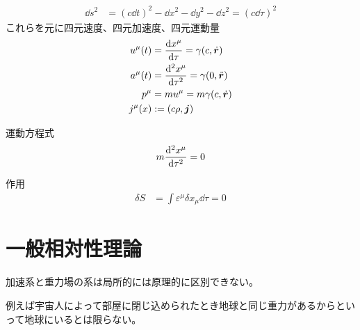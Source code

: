 \documentclass[uplatex,dvipdfmx,a4paper,11pt]{jlreq}
\newcommand{\rr}{\bm{r}}
\theoremstyle{definition}
\begin{document}
\begin{definition}[世界間隔]
  \begin{align}
    \dd{s}^2 & = (c\dd{t})^2 - \dd{x}^2 - \dd{y}^2 - \dd{z}^2 = (c\dd{\tau})^2
  \end{align}
  これらを元に四元速度、四元加速度、四元運動量
  \begin{align}
    u^\mu(t) & = \dv{x^\mu}{\tau} = \gamma(c, \dot{\rr})     \\
    a^\mu(t) & = \dv[2]{x^\mu}{\tau} = \gamma(0, \ddot{\rr}) \\
    p^\mu    & = mu^\mu = m\gamma(c, \dot{\rr})              \\
    j^\mu(x) & := (c\rho, \bm{j})                            \\
  \end{align}
\end{definition}

運動方程式
\begin{align}
  m\dv[2]{x^\mu}{\tau} = 0
\end{align}

作用
\begin{align}
  \delta S & = \int \varepsilon^\mu\delta x_\mu\dd{\tau} = 0
\end{align}

\section{一般相対性理論}
\begin{axiom}[アインシュタインの等価原理]
  加速系と重力場の系は局所的には原理的に区別できない。
\end{axiom}
例えば宇宙人によって部屋に閉じ込められたとき地球と同じ重力があるからといって地球にいるとは限らない。
\end{document}
